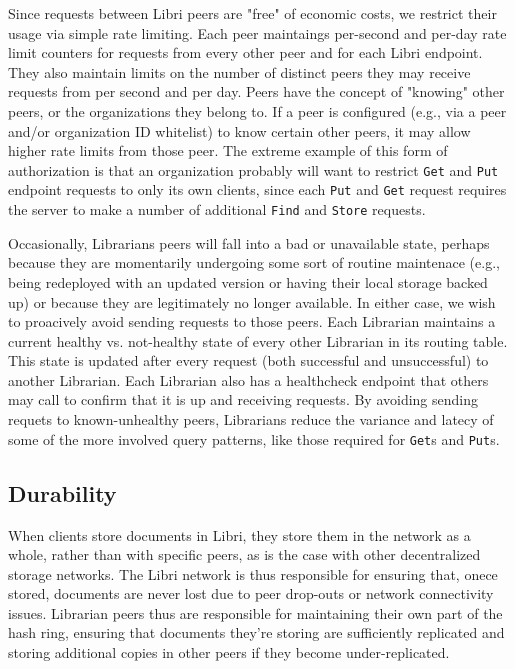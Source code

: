 \documentclass[10pt]{article}
\newcommand{\ttt}[1]{\texttt{#1}}
\begin{document}
Since requests between Libri peers are "free" of economic costs, we restrict their usage via simple rate limiting. Each peer maintaings per-second and per-day rate limit counters for requests from every other peer and for each Libri endpoint. They also maintain limits on the number of distinct peers they may receive requests from per second and per day. Peers have the concept of "knowing" other peers, or the organizations they belong to. If a peer is configured (e.g., via a peer and/or organization ID whitelist) to know certain other peers, it may allow higher rate limits from those peer. The extreme example of this form of authorization is that an organization probably will want to restrict \ttt{Get} and \texttt{Put} endpoint requests to only its own clients, since each \texttt{Put} and \texttt{Get} request requires the server to make a number of additional \texttt{Find} and \texttt{Store} requests. 

Occasionally, Librarians peers will fall into a bad or unavailable state, perhaps because they are momentarily undergoing some sort of routine maintenace (e.g., being redeployed with an updated version or having their local storage backed up) or because they are legitimately no longer available. In either case, we wish to proacively avoid sending requests to those peers. Each Librarian maintains a current healthy vs. not-healthy state of every other Librarian in its routing table. This state is updated after every request (both successful and unsuccessful) to another Librarian. Each Librarian also has a healthcheck endpoint that others may call to confirm that it is up and receiving requests. By avoiding sending requets to known-unhealthy peers, Librarians reduce the variance and latecy of some of the more involved query patterns, like those required for \ttt{Get}s and \texttt{Put}s.

\subsection{Durability}

When clients store documents in Libri, they store them in the network as a whole, rather than with specific peers, as is the case with other decentralized storage networks. The Libri network is thus responsible for ensuring that, onece stored, documents are never lost due to peer drop-outs or network connectivity issues. Librarian peers thus are responsible for maintaining their own part of the hash ring, ensuring that documents they're storing are sufficiently replicated and storing additional copies in other peers if they become under-replicated. 
\end{document}
